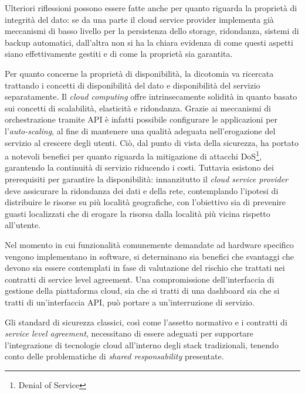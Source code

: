 \documentclass[../main.tex]{subfiles}
\begin{document}
Ulteriori riflessioni possono essere fatte anche per quanto riguarda la proprietà di integrità del dato: se da una parte il cloud service provider implementa già meccanismi di basso livello per la persistenza dello storage, ridondanza, sistemi di backup automatici, dall'altra non si ha la chiara evidenza di come questi aspetti siano effettivamente gestiti e di come la proprietà sia garantita.


Per quanto concerne la proprietà di disponibilità, la dicotomia va ricercata trattando i concetti di disponibilità del dato e disponibilità del servizio separatamente.
Il \textit{cloud computing} offre intrinsecamente solidità in quanto basato sui concetti di scalabilità, elasticità e ridondanza. Grazie ai meccanismi di orchestrazione tramite API è infatti possibile configurare le applicazioni per l'\textit{auto-scaling}, al fine di mantenere una qualità adeguata nell'erogazione del servizio al crescere degli utenti. Ciò, dal punto di vista della sicurezza, ha portato a notevoli benefici per quanto riguarda la mitigazione di attacchi DoS\footnote{Denial of Service}, garantendo la continuità di servizio riducendo i costi.
Tuttavia esistono dei prerequisiti per garantire la disponibilità: innanzitutto il \textit{cloud service provider} deve assicurare la ridondanza dei dati e della rete, contemplando l'ipotesi di distribuire le risorse su più località geografiche, con l'obiettivo sia di prevenire guasti localizzati che di erogare la risorsa dalla località più vicina rispetto all'utente.

Nel momento in cui funzionalità comunemente demandate ad hardware specifico vengono implementano in software, si determinano sia benefici che svantaggi che devono sia essere contemplati in fase di valutazione del rischio che trattati nei contratti di service level agreement. Una compromissione dell'interfaccia di gestione della piattaforma cloud, sia che si tratti di una dashboard sia che si tratti di un'interfaccia API, può portare a un'interruzione di servizio.

Gli standard di sicurezza classici, così come l'assetto normativo e i contratti di \textit{service level agreement}, necessitano di essere adeguati per supportare l'integrazione di tecnologie cloud all'interno degli stack tradizionali, tenendo conto delle problematiche di \textit{shared responsability} presentate.
\end{document}
